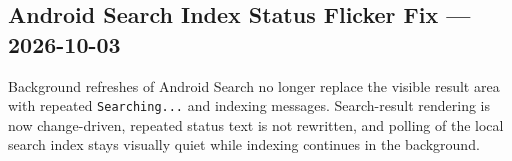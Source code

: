\documentclass[a4paper]{article}
\title{}
\date{}
\author{Mohammad Rahmani}
\begin{document}
   \maketitle

   \begin{preview}
      \section*{Android Search Index Status Flicker Fix --- 2026-10-03}
      Background refreshes of Android Search no longer replace the visible result area with
      repeated \texttt{Searching...} and indexing messages. Search-result rendering is now
      change-driven, repeated status text is not rewritten, and polling of the local search
      index stays visually quiet while indexing continues in the background.
   \end{preview}

   
   
\end{document}
